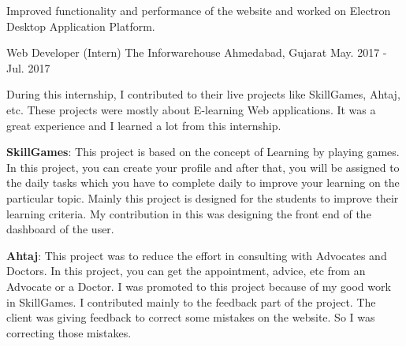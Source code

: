 \begin{cventries}
{\begin{cvitems}
        \item {Improved functionality and performance of the website and worked on Electron Desktop Application Platform.}
      \end{cvitems}
    }
  \cventry
    {Web Developer (Intern)}
    {The Inforwarehouse}
    {Ahmedabad, Gujarat}
    {May. 2017 - Jul. 2017}
    {
      \begin{cvitems}
        \item {During this internship, I contributed to their live projects like SkillGames, Ahtaj, etc. These projects were mostly about E-learning Web applications. It was a great experience and I learned a lot from this internship.}
        \item {\textbf{SkillGames}: This project is based on the concept of Learning by playing games. In this project, you can create your profile and after that, you will be assigned to the daily tasks which you have to complete daily to improve your learning on the particular topic. Mainly this project is designed for the students to improve their learning criteria. My contribution in this was designing the front end of the dashboard of the user.}
        \item {\textbf{Ahtaj}: This project was to reduce the effort in consulting with Advocates and Doctors. In this project, you can get the appointment, advice, etc from an Advocate or a Doctor. I was promoted to this project because of my good work in SkillGames. I contributed mainly to the feedback part of the project. The client was giving feedback to correct some mistakes on the website. So I was correcting those mistakes.}
      \end{cvitems}
    }
    
  
\end{cventries}
